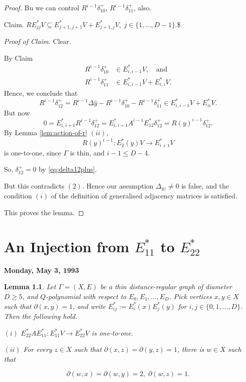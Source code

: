 \documentclass[
]{book}
\newtheorem{lemma}{Lemma}[chapter]
\theoremstyle{definition}
\theoremstyle{definition}
\theoremstyle{definition}
\theoremstyle{definition}
\theoremstyle{remark}
\begin{document}
\begin{proof}
Bu we can control \(R^{i-1}\delta^+_{10}\), \(R^{i-1}\delta^+_{11}\), also.

Claim. \(RE^*_{jj}V \subseteq E^*_{j+1,j+1}V + E^*_{j+1, j}V, \; j\in \{1, \ldots, D-1\}.\)\$

\emph{Proof of Claim.} Clear.

By Claim
\begin{align}
R^{i-1}\delta^+_{10} &\in E^*_{i,i-1}V, \quad \text{and}\\
R^{i-1}\delta^+_{11} & \in E^*_{i,i-1}V + E^*_{i,i}V.
\end{align}
Hence, we conclude that
\[R^{i-1}\delta^+_{12} = R^{i-1}\Delta \hat{y} - R^{i-1}\delta^+_{10} - R^{i-1}\delta^+_{11}\in E^*_{i,i-1}V + E^*_{ii}V.\]
But now
\begin{equation}
0 = E^*_{i,i+1}R^{i-1}\delta^+_{12} = E^*_{i,i+1}A^{i-1}E^*_{12}\delta^+_{12} = R(y)^{i-1}\delta^+_{12}. \label{eq:delta12plus}
\end{equation}
By Lemma \ref{lem:action-of-r} \((ii)\),
\[R(y)^{i-1}: E^*_2(y)V \longrightarrow E^*_{i+1}V\]
is one-to-one, since \(\Gamma\) is thin, and \(i-1\leq D-4\).

So, \(\delta^+_{12}=0\) by \eqref{eq:delta12plus}.

But this contradicts \((2)\). Hence our assumption \(\Delta_{yz}\neq 0\) is false, and the condition \((i)\) of the definition of generalised adjacency matrices is satisfied.

This proves the lemma.
\end{proof}

\hypertarget{lec38}{%
\chapter{\texorpdfstring{An Injection from \(E^*_{11}\) to \(E^*_{22}\)}{An Injection from E\^{}*\_\{11\} to E\^{}*\_\{22\}}}\label{lec38}}

\textbf{Monday, May 3, 1993}

\begin{lemma}
\protect\hypertarget{lem:e11star-to-e22star}{}\label{lem:e11star-to-e22star}Let \(\Gamma = (X, E)\) be a thin distance-regular graph of diameter \(D\geq 5\), and \(Q\)-polynomial with respect to \(E_0, E_1, \ldots, E_D\).
Pick vertices \(x,y\in X\) such that \(\partial(x,y) = 1\), and write \(E^*_{ij}:=E^*_i(x)E^*_j(y)\) for \(i,j\in \{0, 1, \ldots, D\}\). Then the following hold.

\((i)\) \(E^*_{22}AE^*_{11}: E^*_{11}V \to E^*_{22}V\) is one-to-one.

\((ii)\) For every \(z\in X\) such that \(\partial(x,z) = \partial(y,z) = 1\), there is \(w\in X\) such that

\[\partial(w,x) = \partial(w,y) = 2, \; \partial(w,z)=1.\]
\end{lemma}
\end{document}
